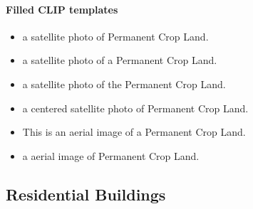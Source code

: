 \documentclass[11pt]{article}
\begin{document}
\paragraph{Filled CLIP templates}\begin{itemize}
\item a satellite photo of Permanent Crop Land.
\item a satellite photo of a Permanent Crop Land.
\item a satellite photo of the Permanent Crop Land.
\item a centered satellite photo of Permanent Crop Land.
\item This is an aerial image of a Permanent Crop Land.
\item a aerial image of Permanent Crop Land.
\end{itemize}
\subsection{Residential Buildings}
\end{document}
